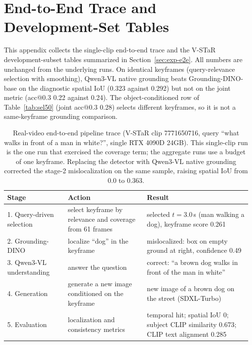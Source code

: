 \documentclass[10pt]{article}
\begin{document}
\section{End-to-End Trace and Development-Set Tables}\label{app:e2e}

This appendix collects the single-clip end-to-end trace and the V-STaR development-subset tables summarized in Section~\ref{sec:exp-e2e}. All numbers are unchanged from the underlying runs. On identical keyframes (query-relevance selection with smoothing), Qwen3-VL native grounding beats Grounding-DINO-base on the diagnostic spatial IoU (0.323 against 0.292) but not on the joint metric (acc@0.3 0.22 against 0.24). The object-conditioned row of Table~\ref{tab:sel50} (joint acc@0.3 0.28) selects different keyframes, so it is not a same-keyframe grounding comparison.

\begin{table}[htbp]
\centering
\small
\begin{tabular}{p{2.4cm}p{5.2cm}p{6.4cm}}
\toprule
Stage & Action & Result \\
\midrule
1. Query-driven selection & select keyframe by relevance and coverage from 61 frames & selected $t=3.0$\,s (man walking a dog), keyframe score 0.261 \\
2. Grounding-DINO & localize ``dog'' in the keyframe & mislocalized: box on empty ground at right, confidence 0.49 \\
3. Qwen3-VL understanding & answer the question & correct: ``a brown dog walks in front of the man in white'' \\
4. Generation & generate a new image conditioned on the keyframe & new image of a brown dog on the street (SDXL-Turbo) \\
5. Evaluation & localization and consistency metrics & temporal hit; spatial IoU 0; subject CLIP similarity 0.673; CLIP text alignment 0.285 \\
\bottomrule
\end{tabular}
\caption{Real-video end-to-end pipeline trace (V-STaR clip 7771650716, query ``what walks in front of a man in white?'', single RTX 4090D 24GB). This single-clip run is the one run that exercised the coverage term; the aggregate runs use a budget of one keyframe. Replacing the detector with Qwen3-VL native grounding corrected the stage-2 mislocalization on the same sample, raising spatial IoU from 0.0 to 0.363.}
\label{tab:trace}
\end{table}
\end{document}
